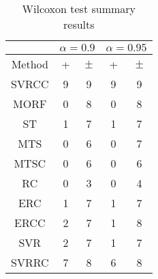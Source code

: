 \documentclass[a4paper,10pt]{article}
\begin{document}
\begin{table}[!htp]
\centering\scriptsize
\begin{tabular}{
|c|c|c|c|c|}
\hline
&\multicolumn{2}{c|}{$\alpha=0.9$} & \multicolumn{2}{c|}{$\alpha=0.95$}\\\hline
Method & + & $\pm$ & + & $\pm$ \\
\hline
SVRCC & 9 & 9 & 9 & 9\\
\hline
MORF & 0 & 8 & 0 & 8\\
\hline
ST & 1 & 7 & 1 & 7\\
\hline
MTS & 0 & 6 & 0 & 7\\
\hline
MTSC & 0 & 6 & 0 & 6\\
\hline
RC & 0 & 3 & 0 & 4\\
\hline
ERC & 1 & 7 & 1 & 7\\
\hline
ERCC & 2 & 7 & 1 & 8\\
\hline
SVR & 2 & 7 & 1 & 7\\
\hline
SVRRC & 7 & 8 & 6 & 8\\
\hline

\end{tabular}
\caption{Wilcoxon test summary results}

\end{table}

 \clearpage 
\end{document}
